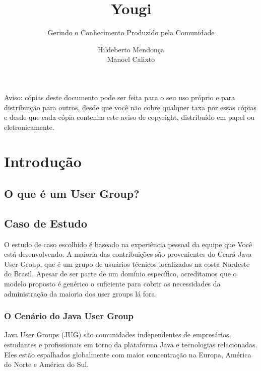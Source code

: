 \documentclass[envcountsame,envcountchap,letterpaper]{svmono}
\author{Hildeberto Mendonça \\ Manoel Calixto}
\title{Yougi}
\subtitle{Gerindo o Conhecimento Produzido pela Comunidade}
\begin{document}
\maketitle

\frontmatter

\thispagestyle{empty}
\vspace*{3.5cm}
\begin{flushleft}
Aviso: cópias deste documento pode ser feita para o seu uso próprio e para distribuição para outros, desde que você não cobre qualquer taxa por essas cópias e desde que cada cópia contenha este aviso de copyright, distribuído em papel ou eletronicamente.
\end{flushleft}

\tableofcontents

\listoffigures

\listoftables

\mainmatter

\chapter{Introdução}

\section{O que é um User Group?}

\section{Caso de Estudo}

O estudo de caso escolhido é baseado na experiência pessoal da equipe que Você está desenvolvendo. A maioria das contribuições são provenientes do Cear\'{a} Java User Group, que é um grupo de usuários técnicos localizados na costa Nordeste do Brasil. Apesar de ser parte de um domínio específico, acreditamos que o modelo proposto é genérico o suficiente para cobrir as necessidades da administração da maioria dos user groups lá fora.

\subsection{O Cenário do Java User Group}

Java User Groups (JUG) são comunidades independentes de empresários, estudantes e profissionais em torno da plataforma Java e tecnologias relacionadas. Eles estão espalhados globalmente com maior concentração na Europa, América do Norte e América do Sul.
\end{document}
